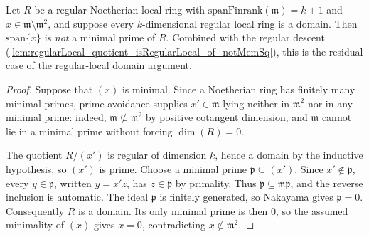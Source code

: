 \begin{lemma}\leanok
  \label{lem:notMem_minimalPrimes_of_regularLocal_succ}
  Let \(R\) be a regular Noetherian local ring with \(\text{spanFinrank}(\mathfrak m) = k + 1\)
  and \(x \in \mathfrak m \setminus \mathfrak m^2\), and suppose every \(k\)-dimensional regular
  local ring is a domain. Then \(\text{span}\{x\}\) is \emph{not} a minimal prime of \(R\).
  Combined with the regular descent
  (\cref{lem:regularLocal_quotient_isRegularLocal_of_notMemSq}), this is the residual
  case of the regular-local domain argument.
\end{lemma}
\begin{proof}

\leanok
  Suppose that \((x)\) is minimal. Since a Noetherian ring has finitely many
  minimal primes, prime avoidance supplies
  \(x'\in\mathfrak m\) lying neither in \(\mathfrak m^2\) nor in any minimal
  prime: indeed, \(\mathfrak m\not\subseteq\mathfrak m^2\) by positive
  cotangent dimension, and \(\mathfrak m\) cannot lie in a minimal prime
  without forcing \(\dim(R)=0\).

  The quotient \(R/(x')\) is regular of dimension \(k\), hence a domain by
  the inductive hypothesis, so \((x')\) is prime. Choose a minimal prime
  \(\mathfrak p\subseteq(x')\). Since \(x'\notin\mathfrak p\), every
  \(y\in\mathfrak p\), written \(y=x'z\), has \(z\in\mathfrak p\) by
  primality. Thus \(\mathfrak p\subseteq\mathfrak m\mathfrak p\), and the
  reverse inclusion is automatic. The ideal \(\mathfrak p\) is finitely
  generated, so Nakayama gives \(\mathfrak p=0\). Consequently \(R\) is a
  domain. Its only minimal prime is then \(0\), so the assumed minimality of
  \((x)\) gives \(x=0\), contradicting \(x\notin\mathfrak m^2\).
\end{proof}

